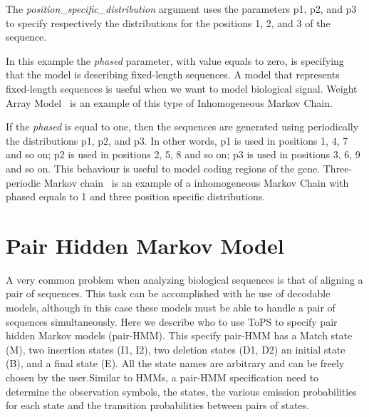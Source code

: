The \textit{position\_specific\_distribution} argument  uses the parameters p1, p2, and p3 to specify respectively the distributions for the positions 1, 2, and 3 of the sequence. 

In this example the \textit{phased} parameter, with value equals to zero, is specifying that the model is describing fixed-length sequences.  A model that represents fixed-length sequences is useful when we want to model biological signal. Weight Array Model~\cite{Zhang1993} is an example of this type of Inhomogeneous Markov Chain.

If the \textit{phased} is equal to one, then the sequences are generated  using  periodically the distributions p1, p2, and p3. In other words, p1 is used in positions 1, 4, 7 and so on; p2 is used in positions 2, 5, 8 and so on; p3 is used in positions 3, 6, 9 and so on. This behaviour is useful to model coding regions of the gene. Three-periodic Markov chain~\cite{Borodovsky1993} is an example of a inhomogeneous Markov Chain with phased  equals to 1 and three position specific distributions.


\section{Pair Hidden Markov Model}\label{pairHMMModelDesc}

A very common problem when analyzing biological sequences is that of aligning a pair of sequences. This task can be accomplished with he use of decodable models, although in this case these models must be able to handle a pair of sequences simultaneously. Here we describe who to use ToPS to specify pair hidden Markov models (pair-HMM). This specify pair-HMM has a Match state (M),  two insertion states (I1, I2), two deletion states (D1, D2) an initial state (B), and a final state (E). All the state names are arbitrary and can be freely chosen by the user.Similar to HMMs, a pair-HMM specification need to determine the observation symbols, the states, the various emission probabilities for each state and the transition probabilities between pairs of states.

